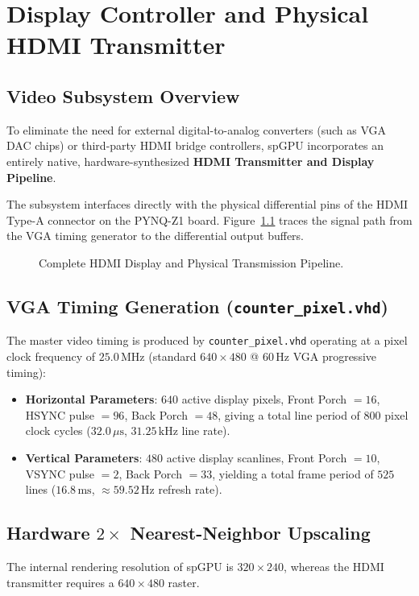 \chapter{Display Controller and Physical HDMI Transmitter}
\label{chap:hdmi_display}

\section{Video Subsystem Overview}
To eliminate the need for external digital-to-analog converters (such as VGA DAC chips) or third-party HDMI bridge controllers, spGPU incorporates an entirely native, hardware-synthesized \textbf{HDMI Transmitter and Display Pipeline}. 

The subsystem interfaces directly with the physical differential pins of the HDMI Type-A connector on the PYNQ-Z1 board. Figure~\ref{fig:hdmi_pipeline} traces the signal path from the VGA timing generator to the differential output buffers.

\begin{figure}[htbp]
\centering
\resizebox{0.95\textwidth}{!}{
    
}
\caption{Complete HDMI Display and Physical Transmission Pipeline.}
\label{fig:hdmi_pipeline}
\end{figure}

\section{VGA Timing Generation (\texttt{counter\_pixel.vhd})}
The master video timing is produced by \texttt{counter\_pixel.vhd} operating at a pixel clock frequency of $25.0\,\text{MHz}$ (standard $640 \times 480$ @ $60\,\text{Hz}$ VGA progressive timing):
\begin{itemize}
    \item \textbf{Horizontal Parameters}: $640$ active display pixels, Front Porch $= 16$, HSYNC pulse $= 96$, Back Porch $= 48$, giving a total line period of $800$ pixel clock cycles ($32.0\,\mu\text{s}$, $31.25\,\text{kHz}$ line rate).
    \item \textbf{Vertical Parameters}: $480$ active display scanlines, Front Porch $= 10$, VSYNC pulse $= 2$, Back Porch $= 33$, yielding a total frame period of $525$ lines ($16.8\,\text{ms}$, $\approx 59.52\,\text{Hz}$ refresh rate).
\end{itemize}

\section{Hardware $2\times$ Nearest-Neighbor Upscaling}
The internal rendering resolution of spGPU is $320 \times 240$, whereas the HDMI transmitter requires a $640 \times 480$ raster. 

